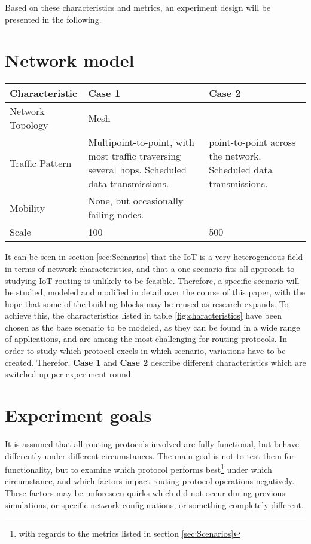 \documentclass{acm_proc_article-sp}
\begin{document}
Based on these characteristics and metrics, an experiment design will be presented in the following.

\section{Network model}
\label{sec:Model}
\begin{table*}[t]
    \begin{tabularx}{\textwidth}{l | X | X  }
      Characteristic & Case 1 & Case 2 \\
      \hline
      Network Topology & Mesh & \\
      Traffic Pattern & Multipoint-to-point, with most traffic traversing several hops. Scheduled data transmissions. & point-to-point across the network. Scheduled data transmissions. \\
      Mobility & None, but occasionally failing nodes. & \\
      Scale & 100 & 500\\
    \end{tabularx}
    \caption{Characteristics of the modeled network(s)}
    \label{fig:characteristics}
\end{table*}

It can be seen in section \ref{sec:Scenarios} that the IoT is a very heterogeneous field in terms of network characteristics, and that a one-scenario-fits-all approach to studying IoT routing is unlikely to be feasible. Therefore, a specific scenario will be studied, modeled and modified in detail over the course of this paper, with the hope that some of the building blocks may be reused as research expands. To achieve this, the characteristics listed in table \ref{fig:characteristics} have been chosen as the base scenario to be modeled, as they can be found in a wide range of applications, and are among the most challenging for routing protocols.
In order to study which protocol excels in which scenario, variations have to be created. Therefor, \textbf{Case 1} and \textbf{Case 2} describe different characteristics which are switched up per experiment round.


\section{Experiment goals}
\label{sec:Goals}
It is assumed that all routing protocols involved are fully functional, but behave differently under different circumstances. The main goal is not to test them for functionality, but to examine which protocol performs best\footnote{ with regards to the metrics listed in section \ref{sec:Scenarios}} under which circumstance, and which factors impact routing protocol operations negatively. These factors may be unforeseen quirks which did not occur during previous simulations, or specific network configurations, or something completely different.\\
\end{document}
